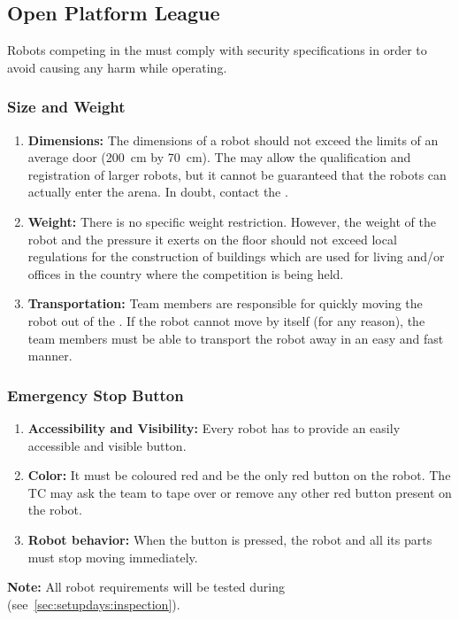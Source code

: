 \subsection{Open Platform League}
\label{sec:rules:robotappearance_opl}
Robots competing in the \OPL{} must comply with security specifications in order to avoid causing any harm while operating.

\subsubsection{Size and Weight}
\label{sec:rules:robotappearance_opl:size}

\begin{enumerate}
	\item \textbf{Dimensions:} The dimensions of a robot should not exceed the limits of an average door (\SI{200}{\centi\meter} by \SI{70}{\centi\meter}). The \TC{} may allow the qualification and registration of larger robots, but it cannot be guaranteed that the robots can actually enter the arena. In doubt, contact the \LOC{}.
	\item \textbf{Weight:} There is no specific weight restriction. However, the weight of the robot and the pressure it exerts on the floor should not exceed local regulations for the construction of buildings which are used for living and/or offices in the country where the competition is being held.
	\item \textbf{Transportation:} Team members are responsible for quickly moving the robot out of the \Arena{}.	If the robot cannot move by itself (for any reason), the team members must be able to transport the robot away in an easy and fast manner.
\end{enumerate}


\subsubsection{Emergency Stop Button}
\label{sec:rules:robotappearance_opl:esb}

\begin{enumerate}
	\item \textbf{Accessibility and Visibility:} Every robot has to provide an easily accessible and visible \EmergencyStop{} button.
	\item \textbf{Color:} It must be coloured red and be the only red button on the robot.
	The TC may ask the team to tape over or remove any other red button present on the robot.
	\item \textbf{Robot behavior:} When the \EmergencyStop{} button is pressed, the robot and all its parts must stop moving immediately.
\end{enumerate}


\noindent\textbf{Note:} All robot requirements will be tested during \RobotInspection{} (see~\ref{sec:setupdays:inspection}).